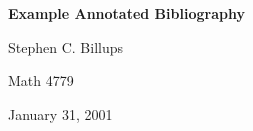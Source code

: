 \documentclass[12pt]{article}
\begin{document}
\begin{center}
   {\Large\textbf{Example Annotated Bibliography}}
\medskip

   {\large   Stephen C. Billups
\medskip

	Math 4779
\medskip

           January 31, 2001
   }
\end{center}
\nocite{*}



\end{document}
